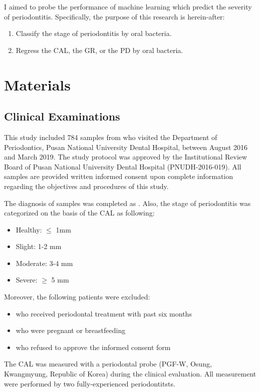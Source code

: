 \documentclass[aps, 11pt, a4paper]{article}
\begin{document}
			I aimed to probe the performance of machine learning which predict the severity of periodontitis. Specifically, the purpose of this research is herein-after:
    		\begin{enumerate}
				\item Classify the stage of periodontitis by oral bacteria.
				\item Regress the CAL, the GR, or the PD by oral bacteria. 
    		\end{enumerate}
    
    \section{Materials}
    	\subsection{Clinical Examinations}
	    	This study included 784 samples from who visited the Department of Periodontics, Pusan National University Dental Hospital, between August 2016 and March 2019. The study protocol was approved by the Institutional Review Board of Pusan National University Dental Hospital (PNUDH-2016-019). All samples are provided written informed consent upon complete information regarding the objectives and procedures of this study.
	    	
	    	The diagnosis of samples was completed as \cite{ref:diagnosis1}. Also, the stage of periodontitis was categorized on the basis of the CAL as following:
	    	\begin{itemize}
	    		\item Healthy: $\leq$ 1mm
				\item Slight: 1-2 mm
				\item Moderate: 3-4 mm
				\item Severe: $\geq$ 5 mm
	    	\end{itemize}
	    
	    	Moreover, the following patients were excluded:
	    	\begin{itemize}
				\item who received periodontal treatment with past six months
				\item who were pregnant or breastfeeding
				\item who refused to approve the informed consent form
	    	\end{itemize}
	    
	    	The CAL was measured with a periodontal probe (PGF-W, Osung, Kwangmyung, Republic of Korea) during the clinical evaluation. All measurement were performed by two fully-experienced periodontitsts.
	    
\end{document}
